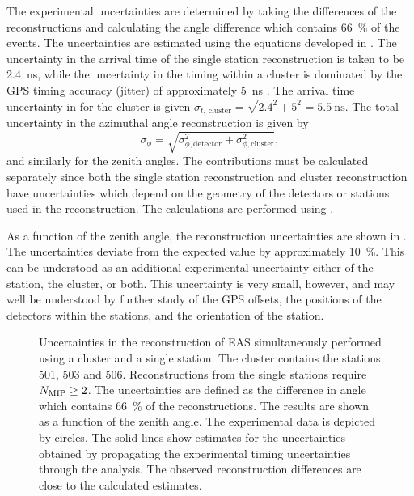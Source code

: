 The experimental uncertainties are determined by taking the differences of the
reconstructions and calculating the angle difference which contains
\SI{66}{\percent} of the events.
The uncertainties are estimated using the equations developed in
.  The uncertainty in the arrival time of
the single station reconstruction is taken to be \SI{2.4}{\nano\second}, while
the uncertainty in the timing within a cluster is dominated by the GPS timing
accuracy (jitter) of approximately \SI{5}{\nano\second} \cite{trimble}.  The
arrival time uncertainty in for the cluster is given
$\sigma_{t,\,\mathrm{cluster}} = \sqrt{2.4^2 + 5^2} =
\SI{5.5}{\nano\second}$. The total uncertainty in the azimuthal angle
reconstruction is given by
\begin{equation}
\sigma_\phi = \sqrt{\sigma_{\phi, \mathrm{detector}}^2 + \sigma_{\phi,
\mathrm{cluster}}^2},
\end{equation}
and similarly for the zenith angles. The contributions must be
calculated separately since both the single station reconstruction and cluster
reconstruction have uncertainties which depend on the geometry of the detectors
or stations used in the reconstruction.
The calculations are performed using .

As a function of the zenith angle, the reconstruction uncertainties are shown in
. The uncertainties
deviate from the expected value by approximately \SI{10}{\percent}. This can be
understood as an additional experimental uncertainty either of the station, the
cluster, or both. This uncertainty is very small, however, and may well be
understood by further study of the GPS offsets, the positions of the detectors
within the stations, and the orientation of the station.

\begin{figure}
\centering
{

}
\caption{Uncertainties in the reconstruction of EAS simultaneously
performed using a cluster and a single station.  The cluster contains the
stations 501, 503 and 506.  Reconstructions from the single stations
require $N_\mathrm{\mip} \geq 2$.  The uncertainties are defined as the
difference in angle which contains \SI{66}{\percent} of the
reconstructions.  The results are shown as a function of the zenith angle.
The experimental data is depicted by circles.  The solid lines show
estimates for the uncertainties obtained by propagating the experimental
timing uncertainties through the analysis.  The observed reconstruction
differences are close to the calculated estimates.}
\label{fig:sp-results-uncertainties}
\end{figure}


